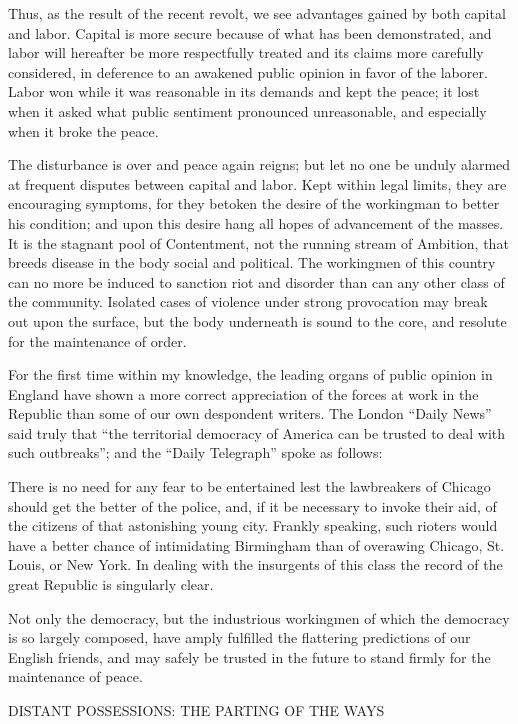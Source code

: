 \documentclass[11pt,openany]{book}
\begin{document}
Thus, as the result of the recent revolt, we see advantages gained by both capital and labor. Capital is more secure because of what has been demonstrated, and labor will hereafter be more respectfully treated and its claims more carefully considered, in deference to an awakened public opinion in favor of the laborer. Labor won while it was reasonable in its demands and kept the peace; it lost when it asked what public sentiment pronounced unreasonable, and especially when it broke the peace.

The disturbance is over and peace again reigns; but let no one be unduly alarmed at frequent disputes between capital and labor. Kept within legal limits, they are encouraging symptoms, for they betoken the desire of the workingman to better his condition; and upon this desire hang all hopes of advancement of the masses. It is the stagnant pool of Contentment, not the running stream of Ambition, that breeds disease in the body social and political. The workingmen of this country can no more be induced to sanction riot and disorder than can any other class of the community. Isolated cases of violence under strong provocation may break out upon the surface, but the body underneath is sound to the core, and resolute for the maintenance of order.

For the first time within my knowledge, the leading organs of public opinion in England have shown a more correct appreciation of the forces at work in the Republic than some of our own despondent writers. The London ``Daily News'' said truly that ``the territorial democracy of America can be trusted to deal with such outbreaks''; and the ``Daily Telegraph'' spoke as follows:

There is no need for any fear to be entertained lest the lawbreakers of Chicago should get the better of the police, and, if it be necessary to invoke their aid, of the citizens of that astonishing young city. Frankly speaking, such rioters would have a better chance of intimidating Birmingham than of overawing Chicago, St. Louis, or New York. In dealing with the insurgents of this class the record of the great Republic is singularly clear.

Not only the democracy, but the industrious workingmen of which the democracy is so largely composed, have amply fulfilled the flattering predictions of our English friends, and may safely be trusted in the future to stand firmly for the maintenance of peace.

DISTANT POSSESSIONS: THE PARTING OF THE WAYS
\end{document}
